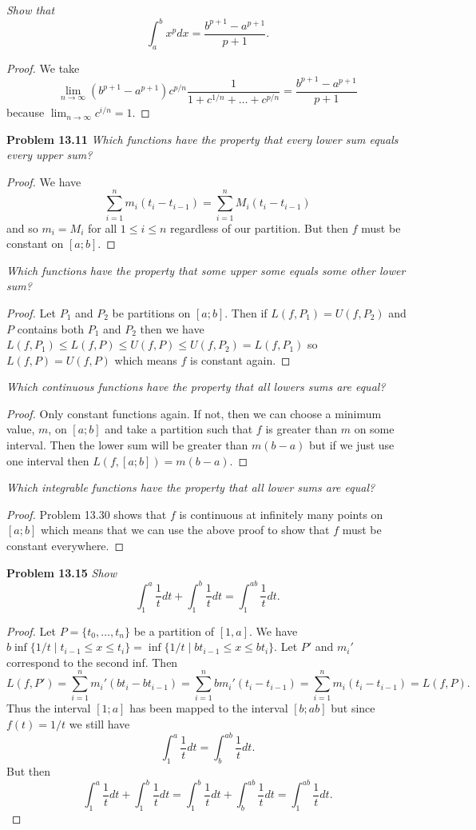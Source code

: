 \documentclass{article}
\begin{document}
\begin{flushleft}
\textsl{Show that
\[
\int_a^b x^p dx = \frac{b^{p+1} - a^{p+1}}{p+1}.
\]}
\begin{proof}
We take
\[
\lim_{n \rightarrow \infty} (b^{p+1}-a^{p+1})c^{p/n} \frac{1}{1+c^{1/n}+ \dots + c^{p/n}} = \frac{b^{p+1} - a^{p+1}}{p+1}
\]
because $\lim_{n \rightarrow \infty} c^{i/n} = 1$.
\end{proof}

\textbf{Problem 13.11}
\textsl{Which functions have the property that every lower sum equals every upper sum?}
\begin{proof}
We have
\[
\sum_{i=1}^n m_i(t_i-t_{i-1}) = \sum_{i=1}^n M_i(t_i-t_{i-1})
\]
and so $m_i=M_i$ for all $1 \leq i \leq n$ regardless of our partition. But then $f$ must be constant on $[a;b]$.
\end{proof}

\textsl{Which functions have the property that some upper some equals some other lower sum?}
\begin{proof}
Let $P_1$ and $P_2$ be partitions on $[a;b]$. Then if $L(f,P_1) = U(f,P_2)$ and $P$ contains both $P_1$ and $P_2$ then we have $L(f,P_1) \leq L(f,P) \leq U(f,P) \leq U(f,P_2) = L(f,P_1)$ so $L(f,P) = U(f,P)$ which means $f$ is constant again.
\end{proof}

\textsl{Which continuous functions have the property that all lowers sums are equal?}
\begin{proof}
Only constant functions again. If not, then we can choose a minimum value, $m$, on $[a;b]$ and take a partition such that $f$ is greater than $m$ on some interval. Then the lower sum will be greater than $m(b-a)$ but if we just use one interval then $L(f,[a;b]) = m(b-a)$.
\end{proof}

\textsl{Which integrable functions have the property that all lower sums are equal?}
\begin{proof}
Problem 13.30 shows that $f$ is continuous at infinitely many points on $[a;b]$ which means that we can use the above proof to show that $f$ must be constant everywhere.
\end{proof}

\textbf{Problem 13.15}
\textsl{Show
\[
\int_1^a \frac{1}{t}dt + \int_1^b \frac{1}{t} dt = \int_1^{ab} \frac{1}{t} dt.
\]}
\begin{proof}
Let $P = \{t_0, \dots ,t_n\}$ be a partition of $[1,a]$. We have $b \inf \{1/t \mid t_{i-1} \leq x \leq t_i\} = \inf \{1/t \mid bt_{i-1} \leq x \leq bt_i\}$. Let $P'$ and $m_i'$ correspond to the second inf. Then
\[
L(f,P') = \sum_{i=1}^n m_i'(bt_i-bt_{i-1}) = \sum_{i=1}^n bm_i'(t_i-t_{i-1}) = \sum_{i=1}^n m_i(t_i-t_{i-1}) = L(f,P).
\]
Thus the interval $[1;a]$ has been mapped to the interval $[b;ab]$ but since $f(t) = 1/t$ we still have
\[
\int_1^a \frac{1}{t} dt = \int_b^{ab} \frac{1}{t} dt.
\]
But then
\[\int_1^a \frac{1}{t}dt + \int_1^b \frac{1}{t} dt = \int_1^b \frac{1}{t}dt + \int_b^{ab} \frac{1}{t} dt = \int_1^{ab} \frac{1}{t} dt.
\]
\end{proof}


\end{flushleft}
\end{document}
